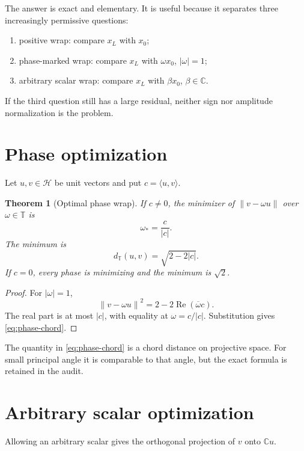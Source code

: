 \documentclass[12pt]{article}
\newtheorem{theorem}{Theorem}[section]
\theoremstyle{remark}
\newcommand{\cH}{\mathcal H}
\newcommand{\norm}[1]{\left\lVert#1\right\rVert}
\begin{document}
The answer is exact and elementary.  It is useful because it separates
three increasingly permissive questions:
\begin{enumerate}[leftmargin=2em]
\item positive wrap: compare $x_L$ with $x_0$;
\item phase-marked wrap: compare $x_L$ with $\omega x_0$,
$|\omega|=1$;
\item arbitrary scalar wrap: compare $x_L$ with $\beta x_0$,
$\beta\in\mathbb C$.
\end{enumerate}
If the third question still has a large residual, neither sign nor amplitude
normalization is the problem.

\section{Phase optimization}

Let $u,v\in\cH$ be unit vectors and put $c=\langle u,v\rangle$.

\begin{theorem}[Optimal phase wrap]\label{thm:phase}
If $c\ne0$, the minimizer of
$\norm{v-\omega u}$ over $\omega\in\mathbb T$ is
\begin{equation}\label{eq:optimal-phase}
 \omega_*=\frac{c}{|c|}.
\end{equation}
The minimum is
\begin{equation}\label{eq:phase-chord}
 d_{\mathbb T}(u,v)
 =\sqrt{2-2|c|}.
\end{equation}
If $c=0$, every phase is minimizing and the minimum is $\sqrt2$.
\end{theorem}

\begin{proof}
For $|\omega|=1$,
\[
 \norm{v-\omega u}^2
 =2-2\operatorname{Re}(\overline\omega c).
\]
The real part is at most $|c|$, with equality at
$\omega=c/|c|$.  Substitution gives \eqref{eq:phase-chord}.
\end{proof}

The quantity in \eqref{eq:phase-chord} is a chord distance on projective
space.  For small principal angle it is comparable to that angle, but the
exact formula is retained in the audit.

\section{Arbitrary scalar optimization}

Allowing an arbitrary scalar gives the orthogonal projection of $v$ onto
$\mathbb Cu$.
\end{document}
